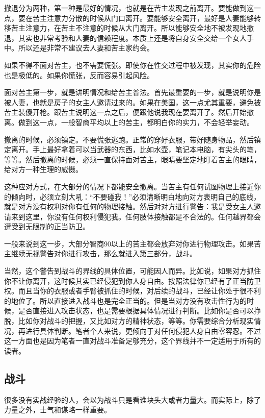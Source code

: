 撤退分为两种，第一种是最好的情况，也就是在苦主发现之前离开。要能做到这一点，要在苦主注意力分散的时候从门口离开。要能够安全离开，最好是人妻能够转移苦主注意力，在苦主不注意的时候从大门离开。所以能够安全地不被发现地撤退，其实也非常考验和人妻的信赖程度。本质上还是将自身安全交给一个女人手中。所以还是非常不建议去人妻和苦主家约会。

如果不得不面对苦主，也不需要慌张。即使你在性交过程中被发现，其实你的危险也是极低的。如果你慌张，反而容易引起风险。

面对苦主第一步，就是讲明情况和给苦主普法。首先最重要的一步，就是说明你是被人妻，也就是房子的女主人邀请过来的。如果在美国，这一点尤其重要，避免被苦主装傻开枪。跟苦主说明这一点之后，便跟他说我现在要离开了。然后开始撤离。做到这一点，一般智商平均以上的苦主，都明白你的实力，不会轻举妄动。

撤离的时候，必须镇定。不要慌张逃跑。正常的穿好衣服，带好随身物品，然后镇定离开。手上最好拿着可以当武器的东西，比如水壶，笔记本电脑，有尖头的笔，等等。然后撤离的时候，必须一直保持面对苦主，眼睛要坚定地盯着苦主的眼睛，给对方一种生理的威慑。

这种应对方式，在大部分的情况下都能安全撤离。当苦主有任何试图物理上接近你的倾向时，必须立刻大吼：“不要碰我！”必须清晰明白地向对方表明自己的底线，就是对方没有权利对你有任何的物理接触。然后对对方进行警告：我是受女主人邀请来到这里，你没有任何权利侵犯我。任何肢体接触都是不合法的。任何越界都会遭受到无限制的正当防卫。

一般来说到这一步，大部分智商90以上的苦主都会放弃对你进行物理攻击。如果苦主继续无视警告对你进行攻击，那么就进入第三部分，战斗。

当然，这个警告到战斗的界线的具体位置，可能因人而异。比如说，如果对方抓住你不让你离开，这时候其实已经侵犯到你人身自由。按照法律你已经有了正当防卫权。而且当你的衣服或者手臂被抓住的时候，对后续的战斗，已经让你处于很不利的地位了。所以直接进入战斗也是完全正当的。但是当对方没有攻击性行为的时候，是否直接进入攻击状态，也是需要根据具体情况进行判断。比如你是否可以挣脱，比如你对战斗的把握，又比如对方的精神状态，等等。你需要综合分析现实情况，再进行具体判断。笔者个人来说，更倾向于对任何侵犯人身自由零容忍。不过这一方面也是因为笔者一直对战斗准备足够充分，这个界线并不一定适用于所有的读者。

\subsection{战斗}

很多没有实战经验的人，会以为战斗只是看谁块头大或者力量大。而实际上，除了力量之外，士气和谋略一样重要。

